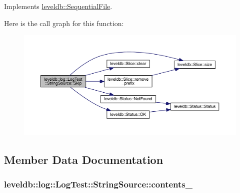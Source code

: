 Implements \hyperlink{classleveldb_1_1_sequential_file_a18c94279fc058cad4d03cdfe04b12179}{leveldb\+::\+Sequential\+File}.



Here is the call graph for this function\+:\nopagebreak
\begin{figure}[H]
\begin{center}
\leavevmode
\includegraphics[width=350pt]{classleveldb_1_1log_1_1_log_test_1_1_string_source_a33266e2d1e98780bd6a2720857a88100_cgraph}
\end{center}
\end{figure}




\subsection{Member Data Documentation}
\hypertarget{classleveldb_1_1log_1_1_log_test_1_1_string_source_aedd5386ec3e8dcbb9027d2b80702fc78}{}
\subsubsection[{contents\+\_\+}]{ leveldb\+::log\+::\+Log\+Test\+::\+String\+Source\+::contents\+\_\+}\label{classleveldb_1_1log_1_1_log_test_1_1_string_source_aedd5386ec3e8dcbb9027d2b80702fc78}
\hypertarget{classleveldb_1_1log_1_1_log_test_1_1_string_source_aac39696e05d613c6123bbae4455c7c27}{}
